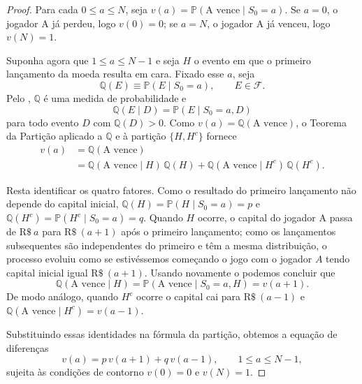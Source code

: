 \documentclass[12pt,portuguese]{article}
\theoremstyle{definition}
\theoremstyle{plainexercise}
\theoremstyle{starredexercise}
\theoremstyle{definition}
\begin{document}
\begin{proof}
  Para cada $0 \leqslant a \leqslant N$, seja
  $v(a) = \mathbb{P}(\text{A vence} \mid S_0 = a)$. Se
  $a = 0$, o jogador A já perdeu, logo $v(0) = 0$; se $a = N$, o jogador A já
  venceu, logo $v(N) = 1$.

  Suponha agora que $1 \leqslant a \leqslant N - 1$ e seja $H$ o evento em que
  o primeiro lançamento da moeda resulta em cara. Fixado esse $a$, seja
  \[
    \mathbb{Q}(E) \equiv \mathbb{P}(E \mid S_0 = a), \qquad E \in \mathcal{F}.
  \]
  Pelo , $\mathbb{Q}$ é uma medida de probabilidade e
  \[
    \mathbb{Q}(E \mid D) = \mathbb{P}(E \mid S_0 = a, D)
  \]
  para todo evento $D$ com $\mathbb{Q}(D) > 0$. Como
  $v(a) = \mathbb{Q}(\text{A vence})$, o Teorema da Partição aplicado a
  $\mathbb{Q}$ e à partição $\{H, H^c\}$ fornece
  \begin{align*}
    v(a)
    &= \mathbb{Q}(\text{A vence}) \\
    &= \mathbb{Q}(\text{A vence} \mid H)\,\mathbb{Q}(H)
     + \mathbb{Q}(\text{A vence} \mid H^c)\,\mathbb{Q}(H^c).
  \end{align*}

  Resta identificar os quatro fatores. Como o resultado do primeiro lançamento
  não depende do capital inicial,
  $\mathbb{Q}(H) = \mathbb{P}(H \mid S_0 = a) = p$ e
  $\mathbb{Q}(H^c) = \mathbb{P}(H^c \mid S_0 = a) = q$. Quando $H$ ocorre, o
  capital do jogador A passa de $\mathrm{R\$}~a$ para $\mathrm{R\$}~(a + 1)$
  após o primeiro lançamento; como os lançamentos subsequentes são
  independentes do primeiro e têm a mesma distribuição, 
  o processo evoluiu como se estivéssemos começando o jogo com o 
  jogador $A$ tendo capital inicial igual $\mathrm{R\$}~(a + 1)$. 
  Usando novamente o  podemos concluir que
  \[ \mathbb{Q}(\text{A vence} \mid H)
   = \mathbb{P}(\text{A vence} \mid S_0 = a, H) = v(a + 1).
   \] 
  De modo análogo,
  quando $H^c$ ocorre o capital cai para $\mathrm{R\$}~(a - 1)$ e
  $\mathbb{Q}(\text{A vence} \mid H^c) = v(a - 1)$.

  Substituindo essas identidades na fórmula da partição, obtemos a equação de
  diferenças
  \begin{equation}\label{eq:ruina-dif-v}
    v(a) = p\,v(a + 1) + q\,v(a - 1), \qquad 1 \leqslant a \leqslant N - 1,
  \end{equation}
  sujeita às condições de contorno $v(0) = 0$ e $v(N) = 1$.


\end{proof}
\end{document}
